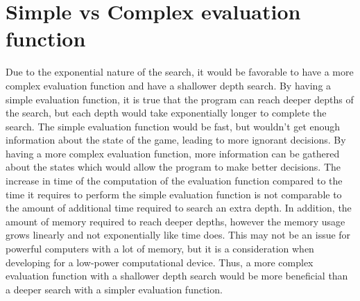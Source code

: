 \documentclass[11pt]{scrartcl}
\begin{document}
\section{Simple vs Complex evaluation function}
Due to the exponential nature of the search, it would be favorable to have a more complex evaluation function and have a shallower depth search. By having a simple evaluation function, it is true that the program can reach deeper depths of the search, but each depth would take exponentially longer to complete the search. The simple evaluation function would be fast, but wouldn't get enough information about the state of the game, leading to more ignorant decisions. By having a more complex evaluation function, more information can be gathered about the states which would allow the program to make better decisions. The increase in time of the computation of the evaluation function compared to the time it requires to perform the simple evaluation function is not comparable to the amount of additional time required to search an extra depth. In addition, the amount of memory required to reach deeper depths, however the memory usage grows linearly and not exponentially like time does. This may not be an issue for powerful computers with a lot of memory, but it is a consideration when developing for a low-power computational device. Thus, a more complex evaluation function with a shallower depth search would be more beneficial than a deeper search with a simpler evaluation function.
\end{document}
